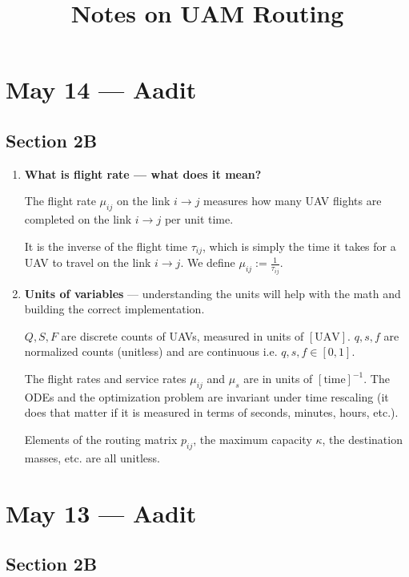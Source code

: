 \documentclass[12pt]{article}
\title{Notes on UAM Routing}
\date{}
\begin{document}
\maketitle

\section*{May 14 --- Aadit}

\subsection*{Section 2B}

\begin{enumerate}
    \item \textbf{What is flight rate --- what does it mean?}

    The flight rate $\mu_{ij}$ on the link $i \to j$ measures how many UAV flights are completed on the link $i \to j$ per unit time.

    It is the inverse of the flight time $ \tau_{ij} $, which is simply the time it takes for a UAV to travel on the link $i \to j$. We define $ \mu_{ij} := \frac{1}{\tau_{ij}} $.

    \item \textbf{Units of variables} --- understanding the units will help with the math and building the correct implementation.

    $Q, S, F$ are discrete counts of UAVs, measured in units of $ [\text{UAV}] $. $q, s, f$ are normalized counts (unitless) and are continuous i.e. $q, s, f \in [0,1]$.

   The flight rates and service rates $ \mu_{ij} $ and $ \mu_s $ are in units of $ [\text{time}]^{-1} $. The ODEs and the optimization problem are invariant under time rescaling (it does that matter if it is measured in terms of seconds, minutes, hours, etc.).

   Elements of the routing matrix $p_{ij}$, the maximum capacity $\kappa$, the destination masses, etc. are all unitless.
    
\end{enumerate}

\section*{May 13 --- Aadit}

\subsection*{Section 2B}
\end{document}
